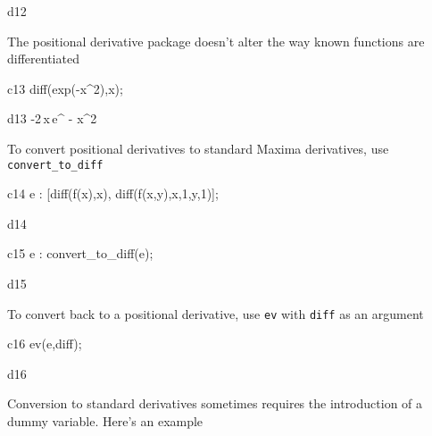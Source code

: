 \documentclass[12pt]{article}
\begin{document}
\begin{mdline}{d12}
\end{mdline}


The positional derivative package doesn't alter the way known functions
are differentiated


\begin{mcline}{c13}
     diff(exp(-x^2),x);
\end{mcline}



\begin{mdline}{d13}
   -2\,x\,e^ {- x^2 }
\end{mdline}


\noindent To convert positional derivatives to standard Maxima derivatives,
use {\tt convert\_to\_diff}


\begin{mcline}{c14}
     e : [diff(f(x),x), diff(f(x,y),x,1,y,1)];
\end{mcline}



\begin{mdline}{d14}
\end{mdline}

\begin{mcline}{c15}
   e : convert_to_diff(e);
\end{mcline}



\begin{mdline}{d15}
\end{mdline}

\noindent To convert back to a positional derivative, use {\tt ev} with {\tt diff} 
as an argument


\begin{mcline}{c16}
     ev(e,diff);
\end{mcline}



\begin{mdline}{d16}
\end{mdline}

\noindent Conversion to standard derivatives  sometimes requires the 
introduction of  a dummy variable. Here's an example
\end{document}

